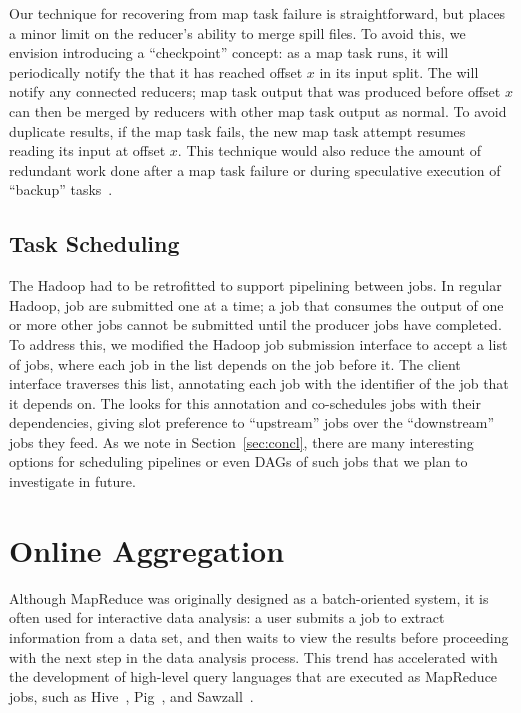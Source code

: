 Our technique for recovering from map task failure is straightforward, but
places a minor limit on the reducer's ability to merge spill files. To avoid
this, we envision introducing a ``checkpoint'' concept: as a map task runs, it
will periodically notify the {\JT} that it has reached offset $x$ in its input
split. The {\JT} will notify any connected reducers; map task output that was
produced before offset $x$ can then be merged by reducers with other map task
output as normal. To avoid duplicate results, if the map task fails, the new map
task attempt resumes reading its input at offset $x$. This technique would also
reduce the amount of redundant work done after a map task failure or during
speculative execution of ``backup'' tasks~\cite{mapreduce-osdi}.

\subsection{Task Scheduling}
\label{sec:pipeline-sched}

The Hadoop {\JT} had to be retrofitted to support pipelining between jobs. In
regular Hadoop, job are submitted one at a time; a job that consumes the output
of one or more other jobs cannot be submitted until the producer jobs have
completed. To address this, we modified the Hadoop job submission interface to
accept a list of jobs, where each job in the list depends on the job before
it. The client interface traverses this list, annotating each job with the
identifier of the job that it depends on. The {\JT} looks for this annotation
and co-schedules jobs with their dependencies, giving slot preference to
``upstream'' jobs over the ``downstream'' jobs they feed.  As we note in
Section~\ref{sec:concl}, there are many interesting options for scheduling
pipelines or even DAGs of such jobs that we plan to investigate in future.

\section{Online Aggregation}
\label{sec:online}

Although MapReduce was originally designed as a batch-oriented system,
it is often used for interactive data analysis: a user submits a job
to extract information from a data set, and then waits to view the
results before proceeding with the next step in the data analysis
process. This trend has accelerated with the development of high-level
query languages that are executed as MapReduce jobs, such as
Hive~\cite{hive}, Pig~\cite{pig}, and Sawzall~\cite{sawzall}.

